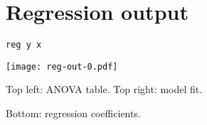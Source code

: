 \documentclass[t]{beamer}
\begin{document}



	\section{Regression output}
				
	\begin{frame}[t]{\texttt{reg y x}}

	\texttt{[image: reg-out-0.pdf]}
	
	Top left: ANOVA table. Top right: model fit.
	
	Bottom: regression coefficients.
	
	\end{frame}

\end{document}
